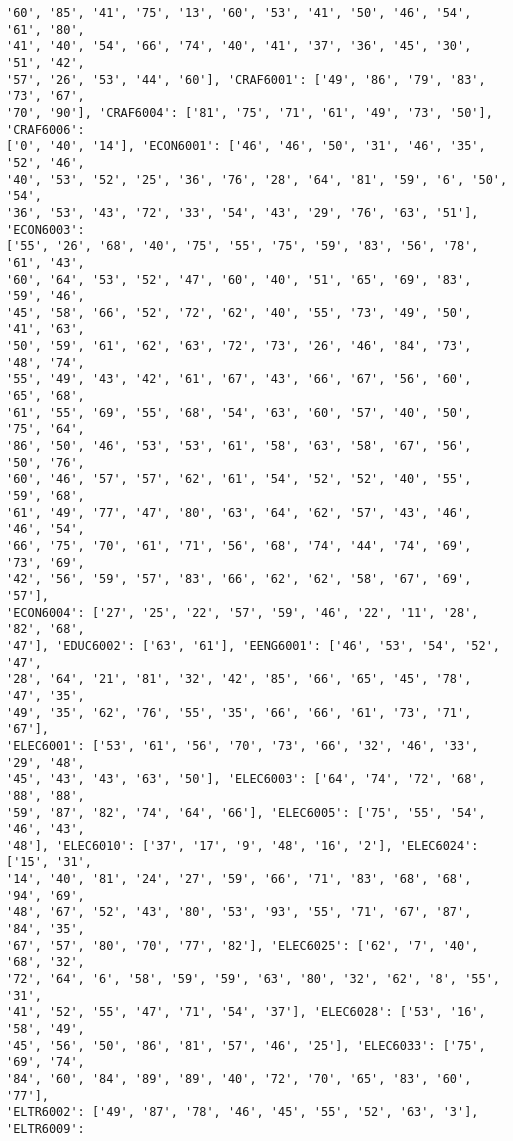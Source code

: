 \documentclass[11pt]{article}
\begin{document}
\begin{Verbatim}[commandchars=\\\{\}]
'60', '85', '41', '75', '13', '60', '53', '41', '50', '46', '54', '61', '80',
'41', '40', '54', '66', '74', '40', '41', '37', '36', '45', '30', '51', '42',
'57', '26', '53', '44', '60'], 'CRAF6001': ['49', '86', '79', '83', '73', '67',
'70', '90'], 'CRAF6004': ['81', '75', '71', '61', '49', '73', '50'], 'CRAF6006':
['0', '40', '14'], 'ECON6001': ['46', '46', '50', '31', '46', '35', '52', '46',
'40', '53', '52', '25', '36', '76', '28', '64', '81', '59', '6', '50', '54',
'36', '53', '43', '72', '33', '54', '43', '29', '76', '63', '51'], 'ECON6003':
['55', '26', '68', '40', '75', '55', '75', '59', '83', '56', '78', '61', '43',
'60', '64', '53', '52', '47', '60', '40', '51', '65', '69', '83', '59', '46',
'45', '58', '66', '52', '72', '62', '40', '55', '73', '49', '50', '41', '63',
'50', '59', '61', '62', '63', '72', '73', '26', '46', '84', '73', '48', '74',
'55', '49', '43', '42', '61', '67', '43', '66', '67', '56', '60', '65', '68',
'61', '55', '69', '55', '68', '54', '63', '60', '57', '40', '50', '75', '64',
'86', '50', '46', '53', '53', '61', '58', '63', '58', '67', '56', '50', '76',
'60', '46', '57', '57', '62', '61', '54', '52', '52', '40', '55', '59', '68',
'61', '49', '77', '47', '80', '63', '64', '62', '57', '43', '46', '46', '54',
'66', '75', '70', '61', '71', '56', '68', '74', '44', '74', '69', '73', '69',
'42', '56', '59', '57', '83', '66', '62', '62', '58', '67', '69', '57'],
'ECON6004': ['27', '25', '22', '57', '59', '46', '22', '11', '28', '82', '68',
'47'], 'EDUC6002': ['63', '61'], 'EENG6001': ['46', '53', '54', '52', '47',
'28', '64', '21', '81', '32', '42', '85', '66', '65', '45', '78', '47', '35',
'49', '35', '62', '76', '55', '35', '66', '66', '61', '73', '71', '67'],
'ELEC6001': ['53', '61', '56', '70', '73', '66', '32', '46', '33', '29', '48',
'45', '43', '43', '63', '50'], 'ELEC6003': ['64', '74', '72', '68', '88', '88',
'59', '87', '82', '74', '64', '66'], 'ELEC6005': ['75', '55', '54', '46', '43',
'48'], 'ELEC6010': ['37', '17', '9', '48', '16', '2'], 'ELEC6024': ['15', '31',
'14', '40', '81', '24', '27', '59', '66', '71', '83', '68', '68', '94', '69',
'48', '67', '52', '43', '80', '53', '93', '55', '71', '67', '87', '84', '35',
'67', '57', '80', '70', '77', '82'], 'ELEC6025': ['62', '7', '40', '68', '32',
'72', '64', '6', '58', '59', '59', '63', '80', '32', '62', '8', '55', '31',
'41', '52', '55', '47', '71', '54', '37'], 'ELEC6028': ['53', '16', '58', '49',
'45', '56', '50', '86', '81', '57', '46', '25'], 'ELEC6033': ['75', '69', '74',
'84', '60', '84', '89', '89', '40', '72', '70', '65', '83', '60', '77'],
'ELTR6002': ['49', '87', '78', '46', '45', '55', '52', '63', '3'], 'ELTR6009':

\end{Verbatim}
\end{document}
